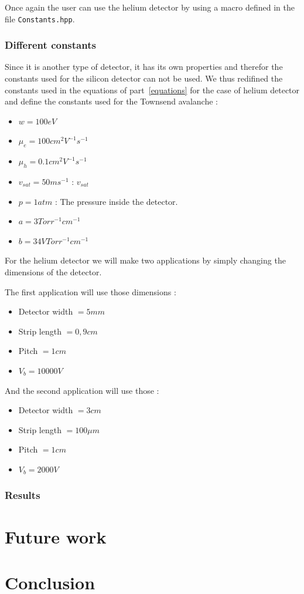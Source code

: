 \documentclass[11pt]{article}
\begin{document}
		Once again the user can use the helium detector by using a macro defined in the file
		\texttt{Constants.hpp}.

		\subsubsection*{Different constants}

			Since it is another type of detector, it has its own properties and therefor the constants
			used for the silicon detector can not be used. We thus redifined the constants used in the
			equations of part~\ref{equations} for the case of helium detector and define the constants
			used for the Townsend avalanche :

			\begin{itemize}

				\item $w = 100 eV$
				\item $\mu_e = 100 cm^2V^{-1}s^{-1}$
				\item $\mu_h = 0.1 cm^2V^{-1}s^{-1}$
				\item $v_{sat} = 50 ms^{-1}$ : $v_{sat}$
				\item $p = 1 atm$ : The pressure inside the detector.
				\item $a = 3 Torr^{-1}cm^{-1}$
				\item $b = 34 VTorr^{-1}cm^{-1}$

			\end{itemize}

			For the helium detector we will make two applications by simply changing the dimensions of
			the detector.

			The first application will use those dimensions :
			\begin{itemize}

				\item Detector width $= 5 mm$
				\item Strip length $= 0,9 cm$
				\item Pitch $= 1 cm$
				\item $V_b = 10000 V$

			\end{itemize}

			And the second application will use those :

			\begin{itemize}

				\item Detector width $= 3 cm$
				\item Strip length $= 100 \mu m$
				\item Pitch $= 1 cm$
				\item $V_b = 2000 V$

			\end{itemize}

		\subsubsection*{Results}


\section{Future work}

\section{Conclusion}

\newpage



\end{document}
